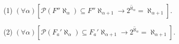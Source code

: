 (1) $(\forall \alpha)[\mathcal{P}(F''\aleph_\alpha) \subseteq F''\aleph_{\alpha+1} \rightarrow \overline{2^{\aleph_\alpha}} = \aleph_{\alpha+1}]$.

(2) $(\forall \alpha)[\mathcal{P}(F_a'\aleph_\alpha) \subseteq F_a'\aleph_{\alpha+1} \rightarrow \overline{2^{\aleph_\alpha}} = \aleph_{\alpha+1}]$.

